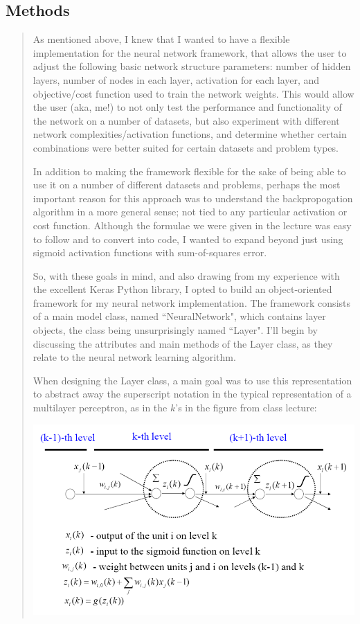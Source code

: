 \documentclass{article}
\begin{document}
\subsection*{Methods}
\begin{quote}
\setlength{\parindent}{10ex}
\quad\quad\quad\quad As mentioned above, I knew that I wanted to have a flexible implementation for the neural network framework, that allows the user to adjust the following basic network structure parameters: number of hidden layers, number of nodes in each layer, activation for each layer, and objective/cost function used to train the network weights. This would allow the user (aka, me!) to not only test the performance and functionality of the network on a number of datasets, but also experiment with different network complexities/activation functions, and determine whether certain combinations were better suited for certain datasets and problem types. 

In addition to making the framework flexible for the sake of being able to use it on a number of different datasets and problems, perhaps the most important reason for this approach was to understand the backpropogation algorithm in a more general sense; not tied to any particular activation or cost function. Although the formulae we were given in the lecture was easy to follow and to convert into code, I wanted to expand beyond just using sigmoid activation functions with sum-of-squares error. 

So, with these goals in mind, and also drawing from my experience with the excellent Keras Python library, I opted to build an object-oriented framework for my neural network implementation. The framework consists of a main model class, named ``NeuralNetwork", which contains layer objects, the class being unsurprisingly named ``Layer". I'll begin by discussing the attributes and main methods of the Layer class, as they relate to the neural network learning algorithm. 

When designing the Layer class, a main goal was to use this representation to abstract away the superscript notation in the typical representation of a multilayer perceptron, as in the $k$'s in the figure from class lecture:
\smallskip

\begin{center}
\includegraphics[scale=0.26]{figs/layer.png}
\end{center}


\end{quote}
\end{document}
